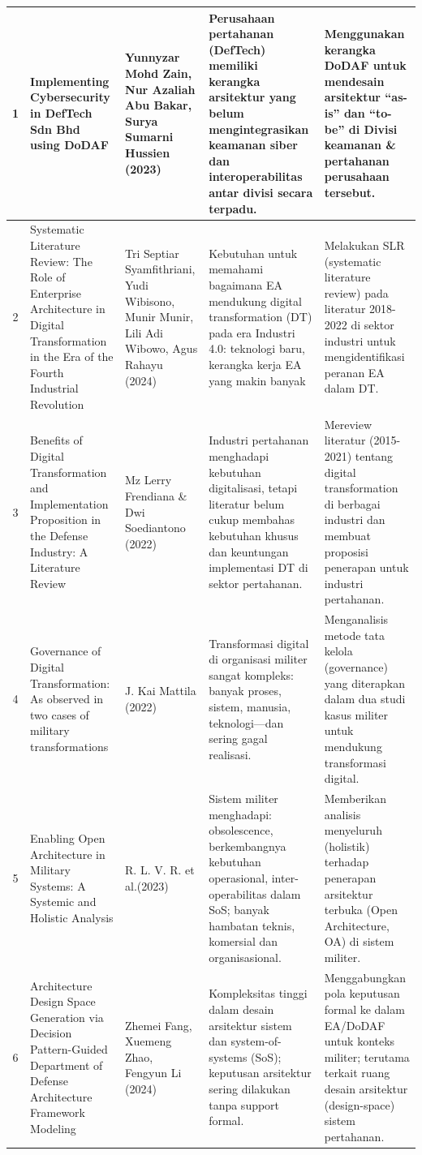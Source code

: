 \begin{longtable}{|c|p{3cm}|p{3cm}|p{3cm}|p{3cm}|}
1 & Implementing Cybersecurity in DefTech Sdn Bhd using DoDAF 
& Yunnyzar Mohd Zain, Nur Azaliah Abu Bakar, Surya Sumarni Hussien (2023) \parencite{Zain2023}
& Perusahaan pertahanan (DefTech) memiliki kerangka arsitektur yang belum mengintegrasikan keamanan siber dan interoperabilitas antar divisi secara terpadu. 
& Menggunakan kerangka DoDAF untuk mendesain arsitektur “as-is” dan “to-be” di Divisi keamanan \& pertahanan perusahaan tersebut. \\
\hline
2 & Systematic Literature Review: The Role of Enterprise Architecture in Digital Transformation in the Era of the Fourth Industrial Revolution 
& Tri Septiar Syamfithriani, Yudi Wibisono, Munir Munir, Lili Adi Wibowo, Agus Rahayu (2024) \parencite{Syamfithriani}
& Kebutuhan untuk memahami bagaimana EA mendukung digital transformation (DT) pada era Industri 4.0: teknologi baru, kerangka kerja EA yang makin banyak
& Melakukan SLR (systematic literature review) pada literatur 2018-2022 di sektor industri untuk mengidentifikasi peranan EA dalam DT. \\
\hline
3 & Benefits of Digital Transformation and Implementation Proposition in the Defense Industry: A Literature Review
& Mz Lerry Frendiana \& Dwi Soediantono (2022)
& Industri pertahanan menghadapi kebutuhan digitalisasi, tetapi literatur belum cukup membahas kebutuhan khusus dan keuntungan implementasi DT di sektor pertahanan.
& Mereview literatur (2015-2021) tentang digital transformation di berbagai industri dan membuat proposisi penerapan untuk industri pertahanan. \\
\hline
4 & Governance of Digital Transformation: As observed in two cases of military transformations
& J. Kai Mattila (2022) \parencite{Mattila2022}
& Transformasi digital di organisasi militer sangat kompleks: banyak proses, sistem, manusia, teknologi—dan sering gagal realisasi.
& Menganalisis metode tata kelola (governance) yang diterapkan dalam dua studi kasus militer untuk mendukung transformasi digital. \\
\hline
5 & Enabling Open Architecture in Military Systems: A Systemic and Holistic Analysis
& R. L. V. R. et al.(2023) \parencite{Radoman2025}
& Sistem militer menghadapi: obsolescence, berkembangnya kebutuhan operasional, inter-operabilitas dalam SoS; banyak hambatan teknis, komersial dan organisasional.
& Memberikan analisis menyeluruh (holistik) terhadap penerapan arsitektur terbuka (Open Architecture, OA) di sistem militer. \\
\hline
6 & Architecture Design Space Generation via Decision Pattern-Guided Department of Defense Architecture Framework Modeling
& Zhemei Fang, Xuemeng Zhao, Fengyun Li (2024) \parencite{Fang2024}
& Kompleksitas tinggi dalam desain arsitektur sistem dan system-of-systems (SoS); keputusan arsitektur sering dilakukan tanpa support formal.
& Menggabungkan pola keputusan formal ke dalam EA/DoDAF untuk konteks militer; terutama terkait ruang desain arsitektur (design-space) sistem pertahanan. \\
\hline
\end{longtable}

